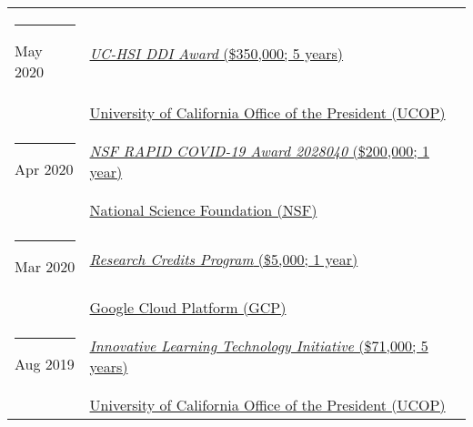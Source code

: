 \documentclass[margin,line]{res}
\begin{document}
\begin{resume}
\begin{longtable}{@{}p{0.7in}p{4in}}
\hspace*{-4mm} \rule{-1mm}{5mm} May 2020 & \href{https://www.ucop.edu/graduate-studies/initiatives-outreach/uc-hsi-ddi.html}{\textit{UC-HSI DDI Award} (\$350,000; 5 years)}\\*
\hspace*{-4mm} \hspace*{-4mm} & \hspace{4mm} \href{https://www.ucop.edu/}{University of California Office of the President (UCOP)}\\
\hspace*{-4mm} \rule{-1mm}{5mm} Apr 2020 & \href{https://www.nsf.gov/awardsearch/showAward?AWD_ID=2028040}{\textit{NSF RAPID COVID-19 Award 2028040} (\$200,000; 1 year)}\\*
\hspace*{-4mm} \hspace*{-4mm} & \hspace{4mm} \href{https://nsf.gov}{National Science Foundation (NSF)}\\
\hspace*{-4mm} \rule{-1mm}{5mm} Mar 2020 & \href{https://edu.google.com/programs/credits/research/}{\textit{Research Credits Program} (\$5,000; 1 year)}\\*
\hspace*{-4mm} \hspace*{-4mm} & \hspace{4mm} \href{https://cloud.google.com/}{Google Cloud Platform (GCP)}\\
\hspace*{-4mm} \rule{-1mm}{5mm} Aug 2019 & \href{https://www.ucop.edu/innovative-learning-technology-initiative/}{\textit{Innovative Learning Technology Initiative} (\$71,000; 5 years)}\\*
\hspace*{-4mm} \hspace*{-4mm} & \hspace{4mm} \href{https://www.ucop.edu/}{University of California Office of the President (UCOP)}\\
\end{longtable}


\end{resume}
\end{document}
